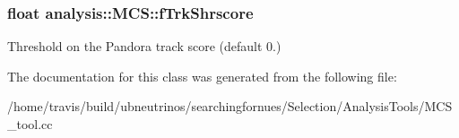 \subsubsection[{\texorpdfstring{f\+Trk\+Shrscore}{fTrkShrscore}}]{\setlength{\rightskip}{0pt plus 5cm}float analysis\+::\+M\+C\+S\+::f\+Trk\+Shrscore\hspace{0.3cm}{\ttfamily [private]}}\hypertarget{classanalysis_1_1MCS_ab1e1092da6852dd280eea3726d0c8195}{}\label{classanalysis_1_1MCS_ab1e1092da6852dd280eea3726d0c8195}
Threshold on the Pandora track score (default 0.) 

The documentation for this class was generated from the following file\+:\begin{DoxyCompactItemize}
\item 
/home/travis/build/ubneutrinos/searchingfornues/\+Selection/\+Analysis\+Tools/M\+C\+S\+\_\+tool.\+cc\end{DoxyCompactItemize}
